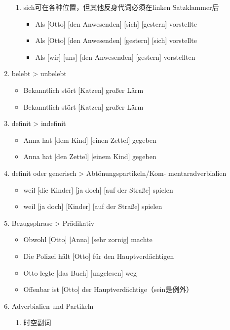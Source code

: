 \documentclass[UTF8]{report}
\begin{document}
\begin{enumerate}
\begin{enumerate}
        \item sich可在各种位置，但其他反身代词必须在linken Satzklammer后
        \begin{itemize}
            \item Als [Otto] [den Anwesenden] [sich] [gestern] vorstellte
            \item Als [Otto] [den Anwesenden] [gestern] [sich] vorstellte
            \item Als [wir] [uns] [den Anwesenden] [gestern] vorstellten
        \end{itemize}
    \end{enumerate}
    \item belebt > unbelebt
    \begin{itemize}
        \item Bekanntlich stört [Katzen] großer Lärm 
        \item Bekanntlich stört [Katzen] großer Lärm
    \end{itemize}
    \item definit > indefinit
    \begin{itemize}
        \item Anna hat [dem Kind] [einen Zettel] gegeben
        \item Anna hat [den Zettel] [einem Kind] gegeben
    \end{itemize}
    \item definit oder generisch > Abtönungspartikeln/Kom- mentaradverbialien
    \begin{itemize}
        \item weil [die Kinder] [ja doch] [auf der Straße] spielen
        \item weil [ja doch] [Kinder] [auf der Straße] spielen
    \end{itemize}
    \item Bezugsphrase > Prädikativ
    \begin{itemize}
        \item Obwohl [Otto] [Anna] [sehr zornig] machte
        \item Die Polizei hält [Otto] für den Hauptverdächtigen
        \item Otto legte [das Buch] [ungelesen] weg
        \item Offenbar ist [Otto] der Hauptverdächtige（sein是例外）
    \end{itemize}
    \item Adverbialien und Partikeln
    \begin{enumerate}
        \item 时空副词

\end{enumerate}
\end{enumerate}
\end{document}
